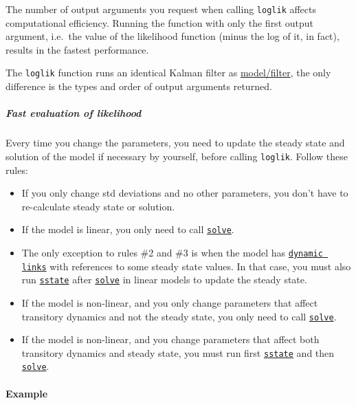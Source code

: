  The number of output arguments you request when calling \texttt{loglik}
 affects computational efficiency. Running the function with only the
 first output argument, i.e.~the value of the likelihood function (minus
 the log of it, in fact), results in the fastest performance.
 
 The \texttt{loglik} function runs an identical Kalman filter as
 \url{model/filter}, the only difference is the types and order of output
 arguments returned.
 
 \subparagraph{Fast evaluation of likelihood}
 
 Every time you change the parameters, you need to update the steady
 state and solution of the model if necessary by yourself, before calling
 \texttt{loglik}. Follow these rules:
 
 \begin{itemize}
 \item
   If you only change std deviations and no other parameters, you don't
   have to re-calculate steady state or solution.
 \item
   If the model is linear, you only need to call
   \href{model/solve}{\texttt{solve}}.
 \item
   The only exception to rules \#2 and \#3 is when the model has
   \href{modellang/links}{\texttt{dynamic links}} with references to some
   steady state values. In that case, you must also run
   \href{model/sstate}{\texttt{sstate}} after
   \href{model/solve}{\texttt{solve}} in linear models to update the
   steady state.
 \item
   If the model is non-linear, and you only change parameters that affect
   transitory dynamics and not the steady state, you only need to call
   \href{model/solve}{\texttt{solve}}.
 \item
   If the model is non-linear, and you change parameters that affect both
   transitory dynamics and steady state, you must run first
   \href{model/sstate}{\texttt{sstate}} and then
   \href{model/solve}{\texttt{solve}}.
 \end{itemize}
 
 \paragraph{Example}


